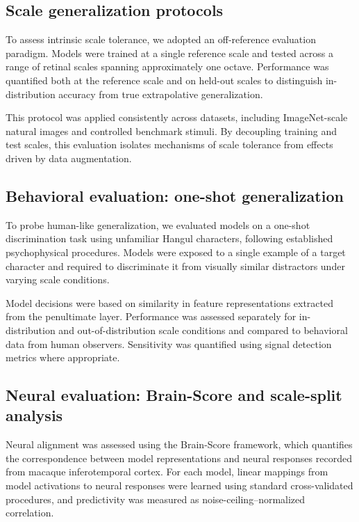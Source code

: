 \documentclass[pdflatex,sn-nature]{sn-jnl}
\begin{document}
\subsection{Scale generalization protocols}

To assess intrinsic scale tolerance, we adopted an off-reference evaluation paradigm. Models were trained at a single reference scale and tested across a range of retinal scales spanning approximately one octave. Performance was quantified both at the reference scale and on held-out scales to distinguish in-distribution accuracy from true extrapolative generalization.

This protocol was applied consistently across datasets, including ImageNet-scale natural images and controlled benchmark stimuli. By decoupling training and test scales, this evaluation isolates mechanisms of scale tolerance from effects driven by data augmentation.

\subsection{Behavioral evaluation: one-shot generalization}

To probe human-like generalization, we evaluated models on a one-shot discrimination task using unfamiliar Hangul characters, following established psychophysical procedures. Models were exposed to a single example of a target character and required to discriminate it from visually similar distractors under varying scale conditions.

Model decisions were based on similarity in feature representations extracted from the penultimate layer. Performance was assessed separately for in-distribution and out-of-distribution scale conditions and compared to behavioral data from human observers. Sensitivity was quantified using signal detection metrics where appropriate.

\subsection{Neural evaluation: Brain-Score and scale-split analysis}

Neural alignment was assessed using the Brain-Score framework, which quantifies the correspondence between model representations and neural responses recorded from macaque inferotemporal cortex. For each model, linear mappings from model activations to neural responses were learned using standard cross-validated procedures, and predictivity was measured as noise-ceiling--normalized correlation.
\end{document}
